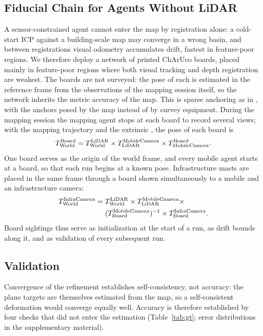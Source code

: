 \subsection{Fiducial Chain for Agents Without LiDAR}
\label{sec:fiducials}
A sensor-constrained agent cannot enter the map by registration alone:
a cold-start ICP against a building-scale map may converge in a wrong
basin, and between registrations visual odometry accumulates drift,
fastest in feature-poor regions. We therefore deploy a network of
printed ChArUco boards, placed mainly in feature-poor regions where
both visual tracking and depth registration are weakest. The boards
are not surveyed: the pose of each is estimated in the reference frame
from the observations of the mapping session itself, so the network
inherits the metric accuracy of the map. This is sparse anchoring as
in \cite{airmuseum}, with the anchors posed by the map instead of by
survey equipment. During the mapping session the mapping agent stops
at each board to record several views; with the mapping trajectory
 and the extrinsic
, the pose of each board is
\begin{equation}
   T_{\mathrm{World}}^{\mathrm{Board}} = T_{\mathrm{World}}^{\mathrm{LiDAR}} \times T_{\mathrm{LiDAR}}^{\mathrm{MobileCamera}} \times T_{\mathrm{MobileCamera}}^{\mathrm{Board}} .
   \label{eq:board_chain}
\end{equation}
One board serves as the origin of the world frame, and every mobile
agent starts at a board, so that each run begins at a known pose.
Infrastructure masts are placed in the same frame through a board shown
simultaneously to a mobile and an infrastructure camera:
\begin{equation}
\begin{split}
  T_{\mathrm{World}}^{\mathrm{InfraCamera}} = {}
    & T_{\mathrm{World}}^{\mathrm{LiDAR}} \times T_{\mathrm{LiDAR}}^{\mathrm{MobileCamera}} \times \\
    &  (T_{\mathrm{Board}}^{\mathrm{MobileCamera}})^{-1} \times T_{\mathrm{Board}}^{\mathrm{InfraCamera}} .
\end{split}
\label{eq:infra_camera_chain}
\end{equation}
Board sightings thus serve as initialization at the start of a run, as
drift bounds along it, and as validation of every subsequent run.

\subsection{Validation}
\label{sec:gt_val}
Convergence of the refinement establishes self-consistency, not
accuracy: the plane targets are themselves estimated from the map, so
a self-consistent deformation would converge equally well. Accuracy is
therefore established by four checks that did not enter the
estimation (Table~\ref{tab:gt}; error distributions in the
supplementary material).

